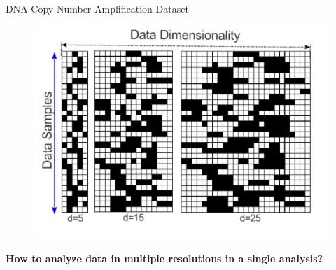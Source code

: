 \documentclass[first=dgreen,second=purple,logo=redexc]{aaltoslides}
\begin{document}
\begin{frame}{DNA Copy Number Amplification Dataset}
\begin{figure}[h!]
  \centering
  \includegraphics[height=0.8\textheight]{figures/datavis}
   \label{Fig:converge}
\end{figure}

\vspace{-6.5mm}

\textbf{{\color{red}How to analyze data in multiple resolutions in a single analysis?}}
\end {frame}

\end{document}
